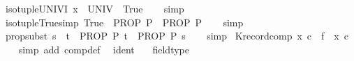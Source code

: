 \begin{isabellebody}
%
\isadelimproof
\isanewline
%
\endisadelimproof
\isanewline
{}\isamarkupfalse%
\ iso{\isacharunderscore}{\kern0pt}tuple{\isacharunderscore}{\kern0pt}UNIV{\isacharunderscore}{\kern0pt}I{\isacharcolon}{\kern0pt}\ {\isachardoublequoteopen}x\ {\isasymin}\ UNIV\ {\isasymequiv}\ True{\isachardoublequoteclose}\isanewline
%
\isadelimproof
\ \ %
\endisadelimproof
%
\isatagproof
{}\isamarkupfalse%
\ simp%
\endisatagproof
{\isafoldproof}%
%
\isadelimproof
\isanewline
%
\endisadelimproof
\isanewline
{}\isamarkupfalse%
\ iso{\isacharunderscore}{\kern0pt}tuple{\isacharunderscore}{\kern0pt}True{\isacharunderscore}{\kern0pt}simp{\isacharcolon}{\kern0pt}\ {\isachardoublequoteopen}{\isacharparenleft}{\kern0pt}True\ {\isasymLongrightarrow}\ PROP\ P{\isacharparenright}{\kern0pt}\ {\isasymequiv}\ PROP\ P{\isachardoublequoteclose}\isanewline
%
\isadelimproof
\ \ %
\endisadelimproof
%
\isatagproof
{}\isamarkupfalse%
\ simp%
\endisatagproof
{\isafoldproof}%
%
\isadelimproof
\isanewline
%
\endisadelimproof
\isanewline
{}\isamarkupfalse%
\ prop{\isacharunderscore}{\kern0pt}subst{\isacharcolon}{\kern0pt}\ {\isachardoublequoteopen}s\ {\isacharequal}{\kern0pt}\ t\ {\isasymLongrightarrow}\ PROP\ P\ t\ {\isasymLongrightarrow}\ PROP\ P\ s{\isachardoublequoteclose}\isanewline
%
\isadelimproof
\ \ %
\endisadelimproof
%
\isatagproof
{}\isamarkupfalse%
\ simp%
\endisatagproof
{\isafoldproof}%
%
\isadelimproof
\isanewline
%
\endisadelimproof
\isanewline
{}\isamarkupfalse%
\ K{\isacharunderscore}{\kern0pt}record{\isacharunderscore}{\kern0pt}comp{\isacharcolon}{\kern0pt}\ {\isachardoublequoteopen}{\isacharparenleft}{\kern0pt}{\isasymlambda}x{\isachardot}{\kern0pt}\ c{\isacharparenright}{\kern0pt}\ {\isasymcirc}\ f\ {\isacharequal}{\kern0pt}\ {\isacharparenleft}{\kern0pt}{\isasymlambda}x{\isachardot}{\kern0pt}\ c{\isacharparenright}{\kern0pt}{\isachardoublequoteclose}\isanewline
%
\isadelimproof
\ \ %
\endisadelimproof
%
\isatagproof
{}\isamarkupfalse%
\ {\isacharparenleft}{\kern0pt}simp\ add{\isacharcolon}{\kern0pt}\ comp{\isacharunderscore}{\kern0pt}def{\isacharparenright}{\kern0pt}%
\endisatagproof
{\isafoldproof}%
%
\isadelimproof
%
\endisadelimproof
%
\isadelimdocument
%
\endisadelimdocument
%
\isatagdocument
%
\isamarkuptrue%
%
\endisatagdocument
{\isafolddocument}%
%
\isadelimdocument
%
\endisadelimdocument
{}\isamarkupfalse%
\isanewline
\ \ ident\ \isanewline
\ \ field{\isacharunderscore}{\kern0pt}type\ \isanewline

\end{isabellebody}
